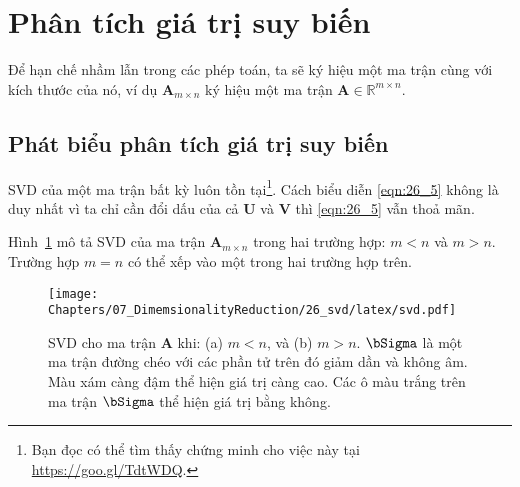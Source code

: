 

\section{Phân tích giá trị suy biến}
Để hạn chế nhầm lẫn trong các phép toán, ta sẽ ký hiệu một ma trận cùng với kích thước của nó, ví dụ $\mathbf{A}_{m \times n}$ ký hiệu một ma trận
$\mathbf{A} \in \mathbb{R}^{m \times n}$.

\subsection{Phát biểu phân tích giá trị suy biến}
{}


SVD của một ma trận bất kỳ luôn tồn tại\footnote{Bạn đọc có thể tìm thấy chứng
minh cho việc này tại \url{https://goo.gl/TdtWDQ}.}. Cách biểu diễn
\eqref{eqn:26_5} không là duy nhất vì ta chỉ cần đổi dấu của cả $\mathbf{U}$ và
$\mathbf{V}$ thì \eqref{eqn:26_5} vẫn thoả mãn.

Hình~\ref{fig:26_1} mô tả SVD của ma trận $\mathbf{A}_{m \times n}$ trong hai
trường hợp: $m < n$ và $m > n$. Trường hợp $m =n$ có thể xếp vào một trong hai
trường hợp trên.

\begin{figure}[t]
\centering
\texttt{[image: Chapters/07\_DimemsionalityReduction/26\_svd/latex/svd.pdf]}
\caption[]{SVD cho ma trận $\mathbf{A}$ khi: (a) $m < n$, và (b) $m > n$. $\bSigma$ là một ma trận đường chéo với các phần tử trên đó
giảm dần và không âm. Màu xám càng đậm thể hiện giá trị càng cao. Các ô màu
trắng trên ma trận $\bSigma$ thể hiện giá trị bằng không.}
\label{fig:26_1}
\end{figure}
